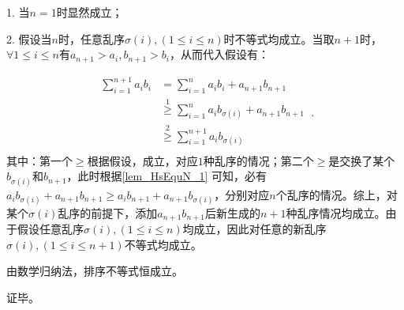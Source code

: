 1. 当$n=1$时显然成立；

2. 假设当$n$时，任意乱序$\sigma(i),(1\leq i\leq n)$时不等式均成立。当取$n+1$时，$\forall 1\leq i\leq n$有$a_{n+1}>a_i,b_{n+1}>b_i$，从而代入假设有：

\begin{equation}
\begin{split}
\sum_{i=1}^{n+1} a_i b_i&=\sum_{i=1}^n a_i b_i+a_{n+1}b_{n+1}\\
&\overset{\mathrm{1}}{\geq} \sum_{i=1}^n a_i b_{\sigma(i)} +a_{n+1}b_{n+1} \\ 
&\overset{\mathrm{2}}{\geq} \sum_{i=1}^{n+1} a_i b_{\sigma(i)} \\
\end{split}~.
\end{equation}
其中：第一个$\geq$根据假设，成立，对应$1$种乱序的情况；第二个$\geq$是交换了某个$b_{\sigma(i)}$和$b_{n+1}$，此时根据\autoref{lem_HsEquN_1} 可知，必有$a_i b_{\sigma(i)}+a_{n+1}b_{n+1}\geq a_ib_{n+1} +a_{n+1}b_{\sigma(i)}$，分别对应$n$个乱序的情况。综上，对某个$\sigma(i)$乱序的前提下，添加$a_{n+1}b_{n+1}$后新生成的$n+1$种乱序情况均成立。由于假设任意乱序$\sigma(i),(1\leq i\leq n)$均成立，因此对任意的新乱序$\sigma(i),(1\leq i\leq n+1)$不等式均成立。

由数学归纳法，排序不等式恒成立。

证毕。

